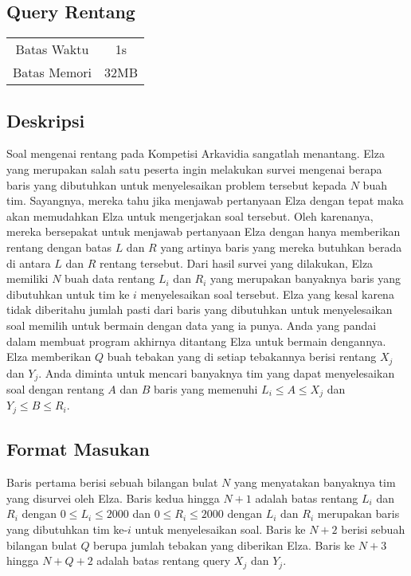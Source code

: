 \documentclass{article}
\begin{document}
\begin{center}
    \section*{Query Rentang} %

    \begin{tabular}{ | c c | }
        \hline
        Batas Waktu  & 1s \\    %
        Batas Memori & 32MB \\  %
        \hline
    \end{tabular}
\end{center}

\subsection*{Deskripsi}

Soal mengenai rentang pada Kompetisi Arkavidia sangatlah menantang.
Elza yang merupakan salah satu peserta ingin melakukan survei mengenai berapa baris yang dibutuhkan untuk menyelesaikan problem tersebut kepada $N$ buah tim.
Sayangnya, mereka tahu jika menjawab pertanyaan Elza dengan tepat maka akan memudahkan Elza untuk mengerjakan soal tersebut.
Oleh karenanya, mereka bersepakat untuk menjawab pertanyaan Elza dengan hanya memberikan rentang dengan batas $L$ dan $R$ yang artinya baris yang mereka butuhkan berada di antara $L$ dan $R$ rentang tersebut.
Dari hasil survei yang dilakukan, 
Elza memiliki $N$ buah data rentang $L_{i}$ dan $R_{i}$ yang merupakan banyaknya baris yang dibutuhkan untuk tim ke $i$ menyelesaikan soal tersebut.
Elza yang kesal karena tidak diberitahu jumlah pasti dari baris yang dibutuhkan untuk menyelesaikan soal memilih untuk bermain dengan data yang ia punya.
Anda yang pandai dalam membuat program akhirnya ditantang Elza untuk bermain dengannya.
Elza memberikan $Q$ buah tebakan yang di setiap tebakannya berisi rentang $X_{j}$ dan $Y_{j}$.
Anda diminta untuk mencari banyaknya tim yang dapat menyelesaikan soal dengan rentang $A$ dan $B$ baris yang memenuhi $L_{i} \leq A \leq X_{j}$ dan $Y_{j} \leq B \leq R_{i}$.


\subsection*{Format Masukan}
Baris pertama berisi sebuah bilangan bulat $N$ yang menyatakan banyaknya tim yang disurvei oleh Elza.
Baris kedua hingga $N + 1$ adalah batas rentang $L_{i}$ dan $R_{i}$ dengan $0 \leq L_{i} \leq 2000$ dan $0 \leq R_{i} \leq 2000$ dengan $L_{i}$ dan $R_{i}$ merupakan baris yang dibutuhkan tim ke-$i$ untuk menyelesaikan soal.
Baris ke $N + 2$ berisi sebuah bilangan bulat $Q$ berupa jumlah tebakan yang diberikan Elza.
Baris ke $N + 3$ hingga $N + Q + 2$ adalah batas rentang query $X_{j}$ dan $Y_{j}$. 
\end{document}
